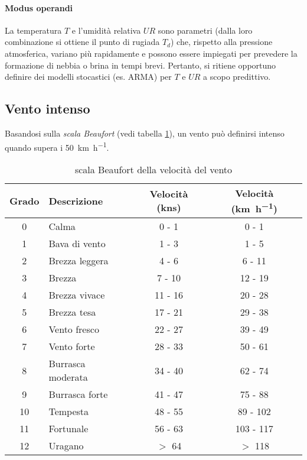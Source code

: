 \paragraph{Modus operandi} La temperatura $T$ e l'umidità relativa $UR$ sono parametri (dalla loro combinazione si ottiene il punto di rugiada $T_d$) che, rispetto alla pressione atmosferica, variano più rapidamente e possono essere impiegati per prevedere la formazione di nebbia o brina in tempi brevi. Pertanto, si ritiene opportuno definire dei modelli stocastici (es. ARMA) per $T$ e $UR$ a scopo predittivo.

\subsection{Vento intenso}
Basandosi sulla \textit{scala Beaufort} (vedi tabella \ref{Beaufort}), un vento può definirsi intenso quando supera i \SI[per-mode=symbol-or-fraction]{50}{\kilo\meter\per\hour}.
\begin{table}[h!]
	\begin{tabular}{|c|l|c|c|}
		\hline
		\textbf{Grado} & \textbf{Descrizione} & \textbf{Velocità} (\si{\knot}s) & \textbf{Velocità} (\si[per-mode=symbol-or-fraction]{\kilo\meter\per\hour})\\ \hline
		0 & Calma & 0 - 1 & 0 - 1 \\ \hline
		1 & Bava di vento & 1 - 3 & 1 - 5 \\ \hline
		2 & Brezza leggera & 4 - 6 & 6 - 11 \\ \hline
		3 & Brezza & 7 - 10 & 12 - 19 \\ \hline
		4 & Brezza vivace & 11 - 16 & 20 - 28 \\ \hline
		5 & Brezza tesa & 17 - 21 & 29 - 38 \\ \hline
		6 & Vento fresco & 22 - 27 & 39 - 49 \\ \hline
		7 & Vento forte & 28 - 33 & 50 - 61 \\ \hline
		8 & Burrasca moderata & 34 - 40 & 62 - 74 \\ \hline
		9 & Burrasca forte & 41 - 47 & 75 - 88 \\ \hline
		10 & Tempesta & 48 - 55 & 89 - 102 \\ \hline
		11 & Fortunale & 56 - 63 & 103 - 117 \\ \hline
		12 & Uragano & $>$ 64 & $>$ 118 \\ \hline
	\end{tabular}
\centering
\caption{scala Beaufort della velocità del vento}
\label{Beaufort}
\end{table}

